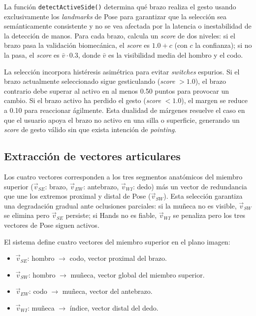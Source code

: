 \documentclass[12pt]{report} %
\begin{document}
La función \texttt{detectActiveSide()} determina qué brazo realiza el gesto usando exclusivamente los \textit{landmarks} de Pose para garantizar que la selección sea semánticamente consistente y no se vea afectada por la latencia o inestabilidad de la detección de manos. Para cada brazo, calcula un \textit{score} de dos niveles: si el brazo pasa la validación biomecánica, el \textit{score} es $1.0 + c$ (con $c$ la confianza); si no la pasa, el \textit{score} es $\bar{v} \cdot 0.3$, donde $\bar{v}$ es la visibilidad media del hombro y el codo.

La selección incorpora histéresis asimétrica para evitar \textit{switches} espurios. Si el brazo actualmente seleccionado sigue gesticulando (\textit{score} $> 1.0$), el brazo contrario debe superar al activo en al menos 0.50 puntos para provocar un cambio. Si el brazo activo ha perdido el gesto (\textit{score} $< 1.0$), el margen se reduce a 0.10 para reaccionar ágilmente. Esta dualidad de márgenes resuelve el caso en que el usuario apoya el brazo no activo en una silla o superficie, generando un \textit{score} de gesto válido sin que exista intención de \textit{pointing}.

\subsection{Extracción de vectores articulares}

Los cuatro vectores corresponden a los tres segmentos anatómicos del miembro superior ($\vec{v}_{SE}$: brazo, $\vec{v}_{EW}$: antebrazo, $\vec{v}_{WI}$: dedo) más un vector de redundancia que une los extremos proximal y distal de Pose ($\vec{v}_{SW}$). Esta selección garantiza una degradación gradual ante oclusiones parciales: si la muñeca no es visible, $\vec{v}_{SW}$ se elimina pero $\vec{v}_{SE}$ persiste; si Hands no es fiable, $\vec{v}_{WI}$ se penaliza pero los tres vectores de Pose siguen activos.

El sistema define cuatro vectores del miembro superior en el plano imagen:

\begin{itemize}
    \item $\vec{v}_{SE}$: hombro $\rightarrow$ codo, vector proximal del brazo.
    \item $\vec{v}_{SW}$: hombro $\rightarrow$ muñeca, vector global del miembro superior.
    \item $\vec{v}_{EW}$: codo $\rightarrow$ muñeca, vector del antebrazo.
    \item $\vec{v}_{WI}$: muñeca $\rightarrow$ índice, vector distal del dedo.
\end{itemize}
\end{document}
